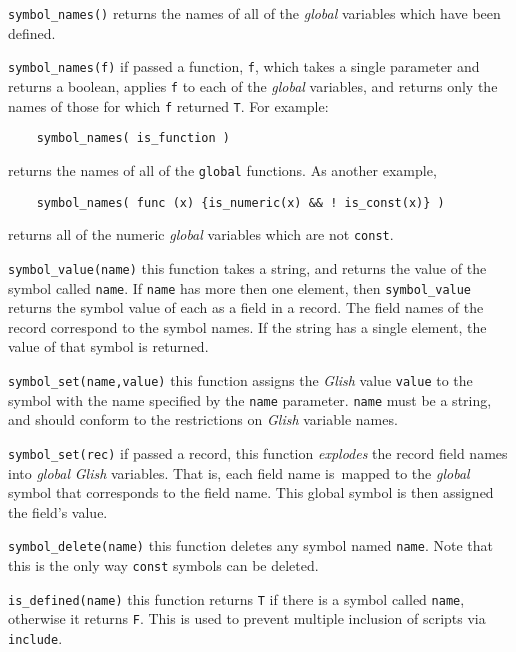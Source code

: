 \begin{sloppy}
\begin{list}{}{}
\item[{\tt symbol\_names()}] \label{symbol_names0-func}
returns the names of all of the {\em global} variables which have been defined.

\item[{\tt symbol\_names(f)}] \label{symbol_names1-func}
if passed a function, {\tt f}, which takes a single 
parameter and returns a
boolean, applies {\tt f} to each of the {\em global} variables,
and returns only the names of those for which {\tt f} returned {\tt T}. For
example:
\begin{verbatim}
    symbol_names( is_function )
\end{verbatim}
returns the names of all of the {\tt global} functions. As another example,
\begin{verbatim}
    symbol_names( func (x) {is_numeric(x) && ! is_const(x)} )
\end{verbatim}
returns all of the numeric {\em global} variables which are not {\tt const}.

\item[{\tt symbol\_value(name)}] \label{symbol_value-func} 
this function takes a string, and returns the value of the symbol called {\tt name}.
If {\tt name} has more then one element, then {\tt symbol\_value} returns the symbol
value of each as a field in a record. The field names of the record correspond to the
symbol names. If the string has a single element, the value of that symbol is returned.

\item[{\tt symbol\_set(name,value)}] \label{symbol_set2-func}
this function assigns the {\em Glish} value {\tt value} to the 
symbol with the name
specified by the {\tt name} parameter. {\tt name} must be a string, and should
conform to the restrictions on {\em Glish} variable names.

\item[{\tt symbol\_set(rec)}] \label{symbol_set1-func}
if passed a record, this function {\em explodes} the record field names into
{\em global} {\em Glish} variables. That is, each field name  is\ mapped to the
{\em global} symbol that corresponds to the field name. This global
symbol is then assigned the field's value.

\item[{\tt symbol\_delete(name)}] \label{symbol_delete-func} 
this function deletes any symbol named {\tt name}. Note that this is the only
way {\tt const} symbols can be deleted.

\item[{\tt is\_defined(name)}] \label{is_defined-func} 
this function returns {\tt T} if there is a symbol called {\tt name}, otherwise
it returns {\tt F}. This is used to prevent multiple inclusion of scripts
via {\tt include}.

\end{list}
\end{sloppy}

